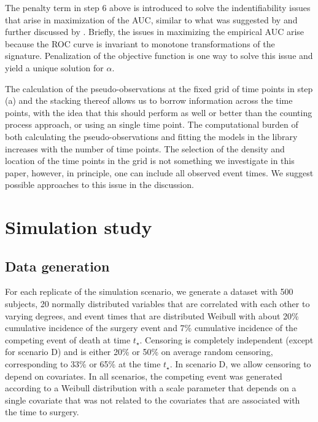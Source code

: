 \documentclass{statsoc}
\begin{document}
The penalty term in step 6 above is introduced to solve the indentifiability issues that arise in maximization of the AUC, similar to what was suggested by \citet{lin2011selection} and further discussed by \citet{fong2016combining}. Briefly, the issues in maximizing the empirical AUC arise because the ROC curve is invariant to monotone transformations of the signature. Penalization of the objective function is one way to solve this issue and yield a unique solution for $\alpha$. 

The calculation of the pseudo-observations at the fixed grid of time points in step (a) and the stacking thereof allows us to borrow information across the time points, with the idea that this should perform as well or better than the counting process approach, or using an single time point. The computational burden of both calculating the pseudo-observations and fitting the models in the library increases with the number of time points. The selection of the density and location of the time points in the grid is not something we investigate in this paper, however, in principle, one can include all observed event times. We suggest possible approaches to this issue in the discussion. 


\section{Simulation study}

\subsection{Data generation}
For each replicate of the simulation scenario, we generate a dataset with 500 subjects, 20 normally distributed variables that are correlated with each other to varying degrees, and event times that are distributed Weibull with about 20\% cumulative incidence of the surgery event and 7\% cumulative incidence of the competing event of death at time $t_{\star}$. Censoring is completely independent (except for scenario D) and is either 20\% or 50\% on average random censoring, corresponding to 33\% or 65\% at the time $t_{\star}$. In scenario D, we allow censoring to depend on covariates. In all scenarios, the competing event was generated according to a Weibull distribution with a scale parameter that depends on a single covariate that was not related to the covariates that are associated with the time to surgery. 
\end{document}
